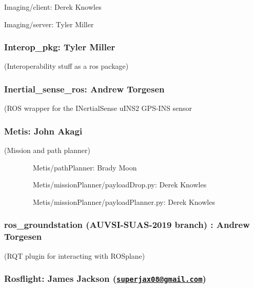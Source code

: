 \documentclass[]{auvsi_doc}
\begin{document}
{Imaging/client: Derek Knowles}

{Imaging/server: Tyler Miller~~~~~~~~}

\hypertarget{h.n49nu7bx5vod}{\subsubsection{\texorpdfstring{{Interop\_pkg:
Tyler Miller}}{Interop\_pkg: Tyler Miller}}\label{h.n49nu7bx5vod}}

{(Interoperability stuff as a ros package)}

\hypertarget{h.3xc7veylyan1}{\subsubsection{\texorpdfstring{{Inertial\_sense\_ros:
Andrew
Torgesen}}{Inertial\_sense\_ros: Andrew Torgesen}}\label{h.3xc7veylyan1}}

{(ROS wrapper for the INertialSense uINS2 GPS-INS sensor}

\hypertarget{h.md8utgthwf1}{\subsubsection{\texorpdfstring{{Metis: John
Akagi}}{Metis: John Akagi}}\label{h.md8utgthwf1}}

{(Mission and path planner)}

{~~~~~~~~Metis/pathPlanner: Brady Moon}

{~~~~~~~~Metis/missionPlanner/payloadDrop.py: Derek Knowles}

{~~~~~~~~Metis/missionPlanner/payloadPlanner.py: Derek Knowles}

\hypertarget{h.oze4xaqxxlu9}{\subsubsection{\texorpdfstring{{ros\_groundstation
(AUVSI-SUAS-2019 branch) : Andrew
Torgesen}}{ros\_groundstation (AUVSI-SUAS-2019 branch) : Andrew Torgesen}}\label{h.oze4xaqxxlu9}}

{(RQT plugin for interacting with ROSplane)}

\hypertarget{h.phcluy8fl6f3}{\subsubsection{\texorpdfstring{{Rosflight:
James Jackson
(}{\href{mailto:superjax08@gmail.com}{\nolinkurl{superjax08@gmail.com}}}{)}}{Rosflight: James Jackson (superjax08@gmail.com)}}\label{h.phcluy8fl6f3}}
\end{document}
